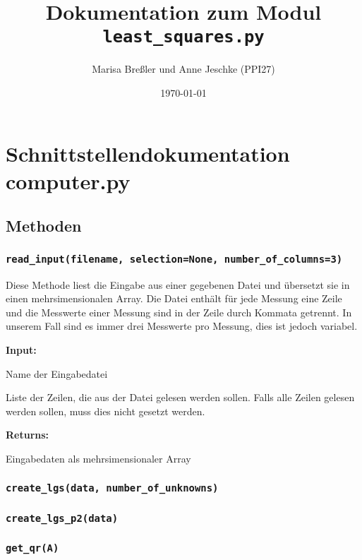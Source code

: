 \documentclass[smallheadings]{scrartcl}
\title{Dokumentation zum Modul \texttt{least\_squares.py}}
\author{Marisa Breßler und Anne Jeschke (PPI27)}
\date{\today}
\newcommand{\initem}[2]{\item[\hspace{0.5em} {\normalfont\ttfamily{#1}} {\normalfont\itshape{(#2)}}]}
\newcommand{\outitem}[1]{\item[\hspace{0.5em} \normalfont\itshape{(#1)}]}
\newcommand{\bfpara}[1]{\noindent \textbf{#1:}\,}
\begin{document}
\maketitle
\tableofcontents

\section{Schnittstellendokumentation computer.py}

\subsection{Methoden}

\subsubsection{\texttt{read\_input(filename, selection=None, number\_of\_columns=3)}}
Diese Methode liest die Eingabe aus einer gegebenen Datei und übersetzt sie in einen mehrsimensionalen Array.
Die Datei enthält für jede Messung eine Zeile und die Messwerte einer Messung sind in der Zeile durch Kommata getrennt.
In unserem Fall sind es immer drei Messwerte pro Messung, dies ist jedoch variabel.

\bfpara{Input}
    \begin{compactdesc}
		    \initem{filename}{String} Name der Eingabedatei
        \initem{selection=None}{list of integers, optional} Liste der Zeilen, die aus der Datei gelesen werden sollen. Falls alle Zeilen gelesen werden sollen, muss dies nicht gesetzt werden.
		\end{compactdesc}
\bfpara{Returns}
    \begin{compactdesc}
		  \outitem{np.ndarray} Eingabedaten als mehrsimensionaler Array
	  \end{compactdesc}

\subsubsection{\texttt{create\_lgs(data, number\_of\_unknowns)}}

\subsubsection{\texttt{create\_lgs\_p2(data)}}

\subsubsection{\texttt{get\_qr(A)}}
\end{document}
